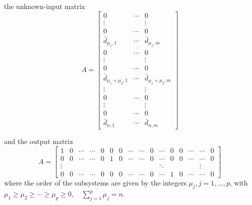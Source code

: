 \documentclass[11pt,letterpaper,twoside,openright]{report}
\begin{document}
the unknown-input matrix
\begin{equation}
A=\left[
\begin{array}{ccc}
0 & \cdots & 0 \\
\vdots & 	   & \vdots \\
0 & \cdots & 0 \\
\bar{d}_{\mu_1,1} & \cdots & \bar{d}_{\mu_1,m} \\
\hline
0 & \cdots & 0 \\
\vdots & 	   & \vdots \\
0 & \cdots & 0 \\
\bar{d}_{\mu_1+\mu_2,1} & \cdots & \bar{d}_{\mu_1+\mu_2,m} \\
\hline
\vdots & & \vdots \\
\hline
0 & \cdots & 0 \\
\vdots & 	   & \vdots \\
0 & \cdots & 0 \\
\bar{d}_{n,1} & \cdots & \bar{d}_{n,m}
\end{array}
\right]
\end{equation}

and the output matrix
\begin{equation}
A=\left[
\begin{array}{ccccc|ccccc|c|ccccc}
1 & 0 & \cdots & \cdots & 0	&	0 & 0 & \cdots & \cdots & 0 & \cdots &		0 & 0 & \cdots & \cdots & 0 \\
0 & 0 & \cdots & \cdots & 0	&	1 & 0 & \cdots & \cdots & 0 & \cdots &		0 & 0 & \cdots & \cdots & 0 \\
\vdots &  &  &  & 		 &  &  &  & 		&  & \ddots &    &  &  & \vdots\\
0 & 0 & \cdots & \cdots & 0	&	0 & 0 & \cdots & \cdots & 	0	& \cdots &		1 & 0 & \cdots & \cdots & 0		
\end{array}
\right]
\end{equation}
where the order of the subsystems are given by the integers $\mu_j, j=1,...,p$, with $\mu_1 \geq \mu_2 \geq \cdots \geq \mu_p \geq 0,\quad \sum_{j=1}^{p}\mu_j=n$.
\end{document}
